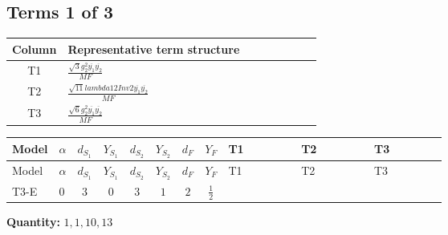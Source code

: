 \documentclass[8pt]{article}
\begin{document}
\begin{landscape}
\subsection*{Terms 1 of 3}
\begin{center}
\begin{tabular}{@{}c >{\raggedright\arraybackslash}p{0.82\linewidth}@{}}
\toprule
Column & Representative term structure \\
\midrule
T1 & \(\displaystyle \frac{\sqrt{3} g_{2}^{2} \overline{y_{1}} \overline{y_{2}}}{MF}\) \\
\midrule
T2 & \(\displaystyle \frac{\sqrt{11} lambda12Inv2 \overline{y_{1}} \overline{y_{2}}}{MF}\) \\
\midrule
T3 & \(\displaystyle \frac{\sqrt{6} g_{2}^{2} \overline{y_{1}} \overline{y_{2}}}{MF}\) \\
\midrule
\bottomrule
\end{tabular}
\end{center}
\smallskip
\tiny
\begin{longtable}{@{}llcccccc >{\raggedright\arraybackslash}p{0.21\linewidth} >{\raggedright\arraybackslash}p{0.21\linewidth} >{\raggedright\arraybackslash}p{0.21\linewidth}@{}}
\toprule
Model & $\alpha$ & $d_{S_1}$ & $Y_{S_1}$ & $d_{S_2}$ & $Y_{S_2}$ & $d_F$ & $Y_F$ & T1 & T2 & T3 \\
\midrule
\endfirsthead
\toprule
Model & $\alpha$ & $d_{S_1}$ & $Y_{S_1}$ & $d_{S_2}$ & $Y_{S_2}$ & $d_F$ & $Y_F$ & T1 & T2 & T3 \\
\midrule
\endhead
T3-E & $0$ & $3$ & $0$ & $3$ & $1$ & $2$ & $\frac{1}{2}$ & \scriptsize\adjustbox{max width=\linewidth}{$\begin{gathered} - \frac{49 \sqrt{3} g_{2}^{2} \overline{y_{1}} \overline{y_{2}}}{24 MF}\end{gathered}$} & \scriptsize\adjustbox{max width=\linewidth}{$\begin{gathered} - \frac{3 \sqrt{11} lambda12Inv2 \overline{y_{1}} \overline{y_{2}}}{22 MF}\end{gathered}$} & \scriptsize\adjustbox{max width=\linewidth}{$\begin{gathered} - \frac{\sqrt{6} g_{2}^{2} \overline{y_{1}} \overline{y_{2}}}{3 MF}\end{gathered}$} \\
\midrule
\bottomrule
\end{longtable}
\clearpage
\noindent\textbf{Quantity: }$\mathrm{1,1,10,13}$\par\smallskip

\end{landscape}
\end{document}
